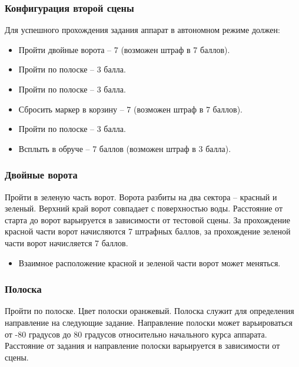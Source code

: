 
\subsubsection*{Конфигурация второй сцены}


Для успешного прохождения задания аппарат в автономном режиме должен:

\begin{itemize}
    \item Пройти двойные ворота – 7 (возможен штраф в 7 баллов).
    \item Пройти по полоске – 3 балла.
    \item Пройти по полоске – 3 балла.
    \item Сбросить маркер в корзину – 7  (возможен штраф в 7 баллов).
    \item Пройти по полоске – 3 балла.
    \item Всплыть в обруче – 7 баллов (возможен штраф в 3 балла).
\end{itemize}

\subsubsection*{Двойные ворота}


Пройти в зеленую часть ворот. Ворота разбиты на два сектора – красный и зеленый. Верхний край ворот совпадает с поверхностью воды. Расстояние от старта до ворот варьируется в зависимости от тестовой сцены. За прохождение красной части ворот начисляются 7 штрафных баллов, за прохождение зеленой части ворот начисляется 7 баллов.

\begin{itemize}
    \item Взаимное расположение красной и зеленой части ворот может меняться. 
\end{itemize}

\subsubsection*{Полоска}


Пройти по полоске. Цвет полоски оранжевый. Полоска служит для определения направление на следующие задание. Направление полоски может варьироваться от   -80 градусов до 80 градусов относительно начального курса аппарата. Расстояние от задания и направление полоски варьируется в зависимости от сцены.

